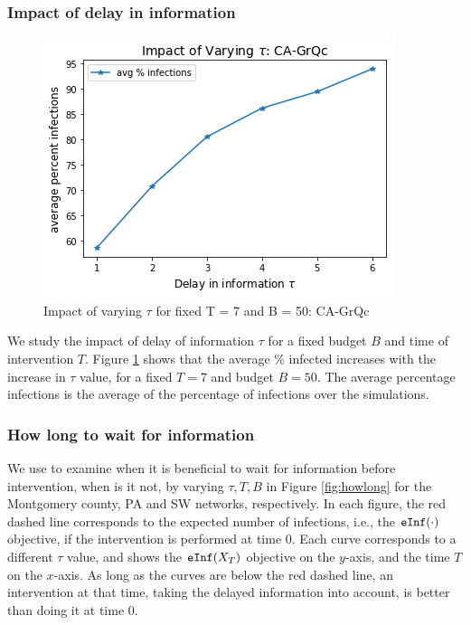 \subsubsection{Impact of delay in information}
\begin{figure}[!h]
    \centering
    \includegraphics[scale = 0.5]{figures/varytauGrQc.png}
    \caption{Impact of varying $\tau$ for fixed T = 7 and B = 50: CA-GrQc}
    \label{fig:T7tau}
\end{figure}

We study the impact of delay of information $\tau$ for a fixed budget $B$ and time of intervention $T$. Figure \ref{fig:T7tau} shows that the average \% infected increases with the increase in $\tau$ value, for a fixed $T = 7$ and budget $B=50$. The average percentage infections is the average of the percentage of infections over the simulations.




\subsubsection{How long to wait for information}
We use \algodelay{} to examine when it is beneficial to wait for information before intervention, when is it not, by varying $\tau, T, B$ in Figure \ref{fig:howlong} for the Montgomery county, PA and SW networks, respectively. In each figure,
the red dashed line corresponds to the expected number of infections, i.e., the $\texttt{eInf}(\cdot)$ objective, if the intervention is performed at time $0$. Each curve corresponds to a different $\tau$ value, and shows the $\texttt{eInf}(X_T)$ objective on the $y$-axis, and the time $T$ on the $x$-axis. As long as the curves are below the red dashed line, an intervention at that time, taking the delayed information into account, is better than doing it at time $0$.

